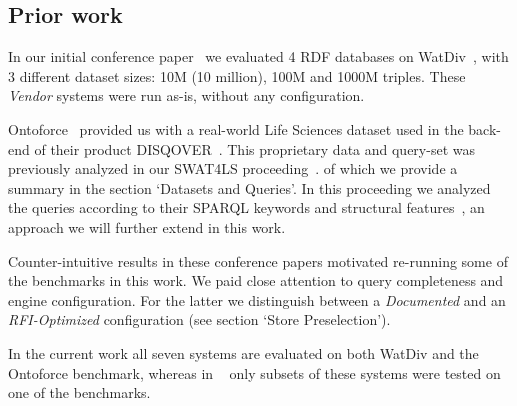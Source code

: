 
\subsection{Prior work}

In our initial conference paper~\cite{de2016big} we evaluated 4 RDF databases on WatDiv~\cite{alucc2014diversified}, with 3 different dataset sizes: 10M (10 million), 100M and 1000M triples. These \emph{Vendor} systems were run as-is, without any configuration. 

Ontoforce~\cite{ontoforcewebsite} provided us with a real-world Life \mbox{Sciences} dataset used in the back-end of their product \mbox{DISQOVER~\cite{disqover}}. This proprietary data and query-set was previously analyzed in our SWAT4LS proceeding~\cite{dewitte_swat4ls_2016}.  of which we provide a summary in the section `Datasets and Queries'. 
In this proceeding we analyzed the queries according to their SPARQL keywords and structural features~\cite{DBLP:journals/corr/abs-1103-5043}, an approach we will further extend in this work. 

Counter-intuitive results in these conference papers motivated re-running some of the benchmarks in this work. We paid close attention to query completeness and engine configuration. For the latter we distinguish between a \emph{Documented} and an \emph{RFI-Optimized} configuration (see section `Store Preselection'). 

In the current work all seven systems are evaluated on both WatDiv and the Ontoforce benchmark, whereas in ~\cite{de2016big,dewitte_swat4ls_2016} only subsets of these systems were tested on one of the benchmarks.


